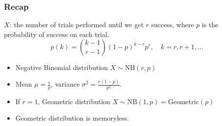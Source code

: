\documentclass[slidestop,compress,mathserif]{beamer}
\begin{document}
\begin{frame}\frametitle{Recap}

$X$: the number of trials performed until we get $r$ success, where $p$ is the probability of success on each trial.
\[ p(k) = {k - 1 \choose r - 1}(1-p)^{k-r}p^{r},\quad k = r, r+1, \ldots \]
\vspace{-0.5cm}
\begin{itemize}
\item Negative Binomial distribution $X \sim \text{NB}(r, p)$
\item Mean $\mu = \frac{r}{p}$, variance $\sigma^2 = \frac{r(1-p)}{p^2}$.
\item If $r = 1$, Geometric distribution $X \sim \text{NB}(1, p) = \text{Geometric}(p)$
\item Geometric distribution is memoryless.
\end{itemize}



\end{frame}
\end{document}
